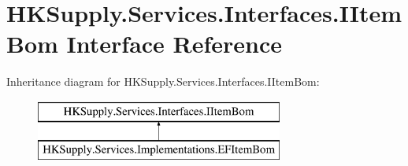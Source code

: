 \hypertarget{interface_h_k_supply_1_1_services_1_1_interfaces_1_1_i_item_bom}{}\section{H\+K\+Supply.\+Services.\+Interfaces.\+I\+Item\+Bom Interface Reference}
\label{interface_h_k_supply_1_1_services_1_1_interfaces_1_1_i_item_bom}
Inheritance diagram for H\+K\+Supply.\+Services.\+Interfaces.\+I\+Item\+Bom\+:\begin{figure}[H]
\begin{center}
\leavevmode
\includegraphics[height=2.000000cm]{interface_h_k_supply_1_1_services_1_1_interfaces_1_1_i_item_bom}
\end{center}
\end{figure}
